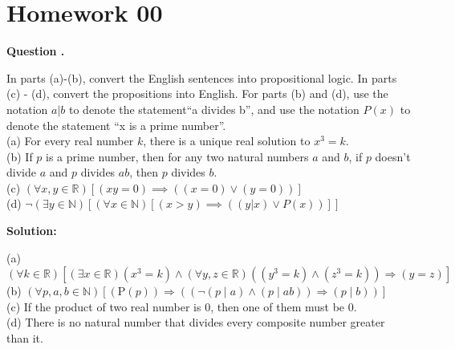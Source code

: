 \documentclass[12pt]{article}
\newcounter{questionnumber}
\newenvironment{question}[1][]{\stepcounter{questionnumber}\par\noindent\textbf{Question \thequestionnumber. #1}\par}{\par}
\newenvironment{solution}{\par\noindent\textbf{Solution:}\par}{\par\vspace{1em}}
\begin{document}
\section{Homework 00}
\begin{question}
    In parts (a)-(b), convert the English sentences into propositional logic. In parts (c) - (d), convert the propositions into English. For parts (b) and (d), use the notation $a | b$ to denote the statement``a divides b'', and use the notation $P(x)$ to denote the statement ``x is a prime number''.\\
    (a) For every real number $k$, there is a unique real solution to $x^3 = k$.\\
    (b) If $p$ is a prime number, then for any two natural numbers $a$ and $b$, if $p$ doesn't divide $a$ and $p$ divides $ab$, then $p$ divides $b$.\\
    (c) $(\forall x, y \in \mathbb{R})\left[(xy = 0) \implies ((x = 0) \lor (y = 0))\right]$\\
    (d) $\neg\left(\exists y \in \mathbb{N}\right)\left[\left(\forall x \in \mathbb{N}\right)\left[(x > y) \implies \left((y | x) \lor P(x)\right)\right]\right]$
\end{question}
\begin{solution}
    \noindent
    (a) $\left( \forall k\in \mathbb{R} \right) \left[ \left( \exists x\in \mathbb{R} \right) \left( x^3=k \right) \land \left( \forall y,z\in \mathbb{R} \right) \left( \left( y^3=k \right) \land \left( z^3=k \right) \right) \Longrightarrow \left( y=z \right) \right] $\\
    (b) $\left( \forall p,a,b\in \mathbb{N} \right) \left[ \left( \mathrm{P}\left( p \right) \right) \Longrightarrow \left( \left( \lnot \left( p\mid a \right) \land \left( p\mid ab \right) \right) \Longrightarrow \left( p\mid b \right) \right) \right] $\\
    (c) If the product of two real number is 0, then one of them must be 0.\\
    (d) There is no natural number that divides every composite number greater than it.
\end{solution}
\end{document}
